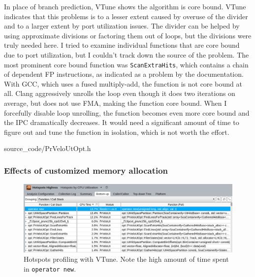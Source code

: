 \documentclass[12pt]{article}
\newcommand{\code}[1]{\texttt{#1}}
\begin{document}
In place of branch prediction, VTune shows the algorithm is core bound. VTune indicates that this problems is to a lesser extent caused by overuse of the divider and to a larger extent by port utilization issues. The divider can be helped by using approximate divisions or factoring them out of loops, but the divisions were truly needed here. I tried to examine individual functions that are core bound due to port utilization, but I couldn't track down the source of the problem. The most prominent core bound function was \code{ScanExtraHits}, which contains a chain of dependent FP instructions, as indicated as a problem by the documentation\cite{intel_vtune_docs}. With GCC, which uses a fused multiply-add, the function is not core bound at all. Clang aggressively unrolls the loop even though it does two iterations on average, but does not use FMA, making the function core bound. When I forcefully disable loop unrolling, the function becomes even more core bound and the IPC dramatically decreases. It would need a significant amount of time to figure out and tune the function in isolation, which is not worth the effort.


	{source_code/PrVeloUtOpt.h}



\subsubsection{Effects of customized memory allocation}


\begin{figure}[H]
	\begin{center}
		\includegraphics[width=\textwidth]{velout_without_alloc}
	\end{center}
	\caption{Hotspots profiling with VTune. Note the high amount of time spent in \code{operator new}.}
	\label{fig_velout_without_alloc}
\end{figure}
\end{document}
